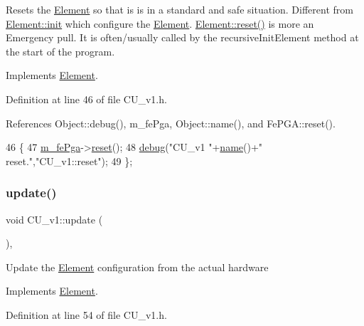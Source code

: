 Resets the \hyperlink{classElement}{Element} so that is is in a standard and safe situation. Different from \hyperlink{classElement_af42754b5cabc198869222725218d695c}{Element\+::init} which configure the \hyperlink{classElement}{Element}. \hyperlink{classElement_a69efffa22f06909d768149715565cb56}{Element\+::reset()} is more an Emergency pull. It is often/usually called by the recursive\+Init\+Element method at the start of the program. 

Implements \hyperlink{classElement_a69efffa22f06909d768149715565cb56}{Element}.



Definition at line 46 of file C\+U\+\_\+v1.\+h.



References Object\+::debug(), m\+\_\+fe\+Pga, Object\+::name(), and Fe\+P\+G\+A\+::reset().


\begin{DoxyCode}
46                \{
47     \hyperlink{classCU__v1_a1b96b95e89dbe383877b34f9b517d910}{m\_fePga}->\hyperlink{classFePGA_abdf7a9dd901351a7eafd748d35172a3c}{reset}();
48     \hyperlink{classObject_aac010553f022165573714b7014a15f0d}{debug}(\textcolor{stringliteral}{"CU\_v1 "}+\hyperlink{classObject_a300f4c05dd468c7bb8b3c968868443c1}{name}()+\textcolor{stringliteral}{" reset."},\textcolor{stringliteral}{"CU\_v1::reset"});
49   \};
\end{DoxyCode}
\mbox{\label{classCU__v1_ac207d770edae7014f9b8ef86c43afc2c}} 
\subsubsection{\texorpdfstring{update()}{update()}}
{\footnotesize\ttfamily void C\+U\+\_\+v1\+::update (\begin{DoxyParamCaption}{ }\end{DoxyParamCaption})\hspace{0.3cm}{\ttfamily [inline]}, {\ttfamily [virtual]}}

Update the \hyperlink{classElement}{Element} configuration from the actual hardware 

Implements \hyperlink{classElement_a4e6c83efae95616ebddd03c793a26661}{Element}.



Definition at line 54 of file C\+U\+\_\+v1.\+h.



